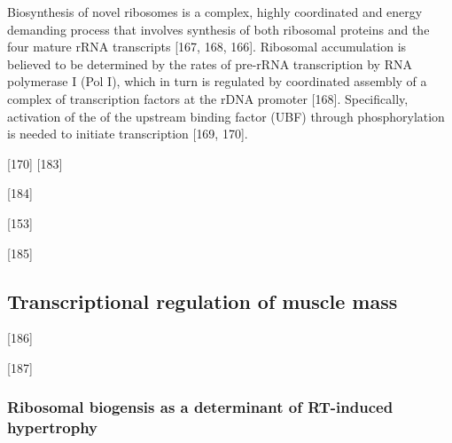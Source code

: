 \documentclass[twoside,10pt]{gihclass} %
\begin{document}
Biosynthesis of novel ribosomes is a complex, highly coordinated and energy demanding process that involves synthesis of both ribosomal proteins and the four mature rRNA transcripts
{[}167, 168, 166{]}.
Ribosomal accumulation is believed to be determined by the rates of pre-rRNA transcription by RNA polymerase I (Pol I), which in turn is regulated by coordinated assembly of a complex of transcription factors at the rDNA promoter
{[}168{]}.
Specifically, activation of the of the upstream binding factor (UBF) through phosphorylation is needed to initiate transcription
{[}169, 170{]}.

{[}170{]}
{[}183{]}

{[}184{]}

{[}153{]}

{[}185{]}

\hypertarget{transcriptional-regulation-of-muscle-mass}{%
\subsection{Transcriptional regulation of muscle mass}\label{transcriptional-regulation-of-muscle-mass}}

{[}186{]}

{[}187{]}

\hypertarget{ribosomal-biogensis-as-a-determinant-of-rt-induced-hypertrophy}{%
\subsubsection{Ribosomal biogensis as a determinant of RT-induced hypertrophy}\label{ribosomal-biogensis-as-a-determinant-of-rt-induced-hypertrophy}}
\end{document}
